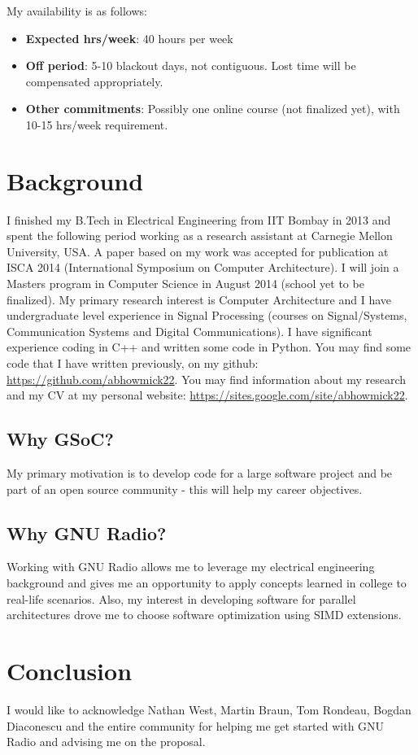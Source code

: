 \documentclass[a4paper,12pt,oneside]{article}
\begin{document}
My availability is as follows:

\begin{itemize}
\item \textbf{Expected hrs/week}: 40 hours per week
\item \textbf{Off period}: 5-10 blackout days, not contiguous. Lost time will be compensated appropriately.
\item \textbf{Other commitments}: Possibly one online course (not finalized yet), with 10-15 hrs/week requirement.
\end{itemize}

\section{Background}
I finished my B.Tech in Electrical Engineering from IIT Bombay in 2013 and spent the following period working as a research assistant at Carnegie Mellon University, USA. A paper based on my work was accepted for publication at ISCA 2014 (International Symposium on Computer Architecture). I will join a Masters program in Computer Science in August 2014 (school yet to be finalized). My primary research interest is Computer Architecture and I have undergraduate level experience in Signal Processing (courses on Signal/Systems, Communication Systems and Digital Communications). I have significant experience coding in C++ and written some code in Python. You may find some code that I have written previously, on my github: \url{https://github.com/abhowmick22}. You may find information about my research and my CV at my personal website: \url{https://sites.google.com/site/abhowmick22}.  

\subsection{Why GSoC?}

My primary motivation is to develop code for a large software project and be part of an open source community - this will help my career objectives.

\subsection{Why GNU Radio?}

Working with GNU Radio allows me to leverage my electrical engineering background and gives me an opportunity to apply concepts learned in college to real-life scenarios. Also, my interest in developing software for parallel architectures drove me to choose software optimization using SIMD extensions. 

\section{Conclusion}
I would like to acknowledge Nathan West, Martin Braun, Tom Rondeau, Bogdan Diaconescu and the entire community for helping me get started with GNU Radio and advising me on the proposal. 

\newpage

\end{document}
